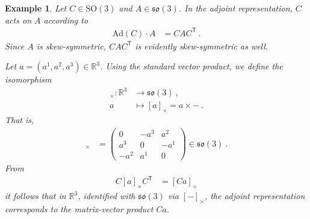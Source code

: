 \documentclass[10pt,a4paper]{article}
\theoremstyle{mytheorem}
\theoremstyle{mydefinition}
\newtheorem{example}[theorem]{Example}
\newcommand{\trans}{^\mathsf{T}}
\newcommand{\Ad}{\mathrm{Ad}}
\newcommand{\SO}{\mathrm{SO}}
\newcommand{\fso}{\mathfrak{so}}
\begin{document}
\begin{example}
\label{ex:Ad}
Let $C\in\SO(3)$ and $A\in\fso(3)$.
In the adjoint representation, $C$ acts on $A$ according to
\begin{align*}
	\Ad(C)\cdot A &= CAC\trans
	\ .
\end{align*}
Since $A$ is skew-symmetric, $CAC\trans$ is evidently skew-symmetric as well.

Let $a=(a^1, a^2, a^3)\in\mathbb{R}^3$.
Using the standard vector product, we define the isomorphism
\begin{align*}
	[-]_\times: 
	\mathbb{R}^3&\rightarrow\fso(3)
	\ ,\nonumber\\
	a &\mapsto [a]_\times = a\times-
	\ .
\end{align*}
That is,
\begin{align*}
	[a]_\times
	&=
	\begin{pmatrix}
		0    & -a^3 &  a^2 \\
		 a^3 &    0 & -a^1 \\
		-a^2 &  a^1 &    0
	\end{pmatrix}
	\in\fso(3)
	\ .
\end{align*}
From
\begin{align*}
	C[a]_\times C\trans &= [Ca]_\times
\end{align*}
it follows that in $\mathbb{R}^3$, identified with $\fso(3)$ via $[-]_\times$, the adjoint representation corresponds to the matrix-vector product $Ca$.
\end{example}
\end{document}
